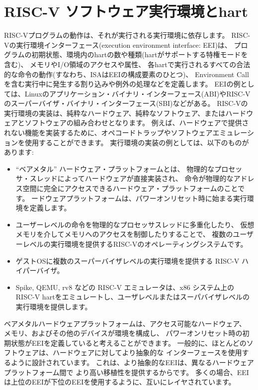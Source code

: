 \section{RISC-V ソフトウェア実行環境とhart}

RISC-Vプログラムの動作は、それが実行される実行環境に依存します。
RISC-Vの実行環境インターフェース(execution environment interface: EEI)は、
プログラムの初期状態、環境内のhartの数や種類(hartがサポートする特権モードを含む)、
メモリやI/O領域のアクセスや属性、
各hartで実行されるすべての合法的な命令の動作(すなわち、ISAはEEIの構成要素のひとつ)、
Environment Callを含む実行中に発生する割り込みや例外の処理などを定義します。
EEIの例としては、Linuxのアプリケーション・バイナリ・インターフェース(ABI)やRISC-Vのスーパーバイザ・バイナリ・インターフェース(SBI)などがある。
RISC-Vの実行環境の実装は、純粋なハードウェア、純粋なソフトウェア、またはハードウェアとソフトウェアの組み合わせとなります。
例えば、ハードウェアで提供されない機能を実装するために、オペコードトラップやソフトウェアエミュレーションを使用することができます。
実行環境の実装の例としては、以下のものがあります:
\begin{itemize}
\item ``ベアメタル'' ハードウェア・プラットフォームとは、
物理的なプロセッサ・スレッドによってハードウェアが直接実装され、
命令が物理的なアドレス空間に完全にアクセスできるハードウェア・プラットフォームのことです。
ードウェアプラットフォームは、パワーオンリセット時に始まる実行環境を定義します。
\item ユーザーレベルの命令を物理的なプロセッサスレッドに多重化したり、
仮想メモリを介してメモリへのアクセスを制御したりすることで、
複数のユーザーレベルの実行環境を提供するRISC-Vのオペレーティングシステムです。
\item ゲストOSに複数のスーパーバイザレベルの実行環境を提供する RISC-V ハイパーバイザ。
\item Spike, QEMU, rv8 などの RISC-V エミュレータは、x86 システム上の RISC-V hartをエミュレートし、ユーザレベルまたはスーパバイザレベルの実行環境を提供します。
\end{itemize}

\begin{commentary}
ベアメタルハードウェアプラットフォームは、アクセス可能なハードウェア、
メモリ、およびその他のデバイスが環境を構成し、
パワーオンリセット時の初期状態がEEIを定義していると考えることができます。
一般的に、ほとんどのソフトウェアは、ハードウェアに対してより抽象的な
インターフェースを使用するように設計されています。
これは、より抽象的なEEIは、異なるハードウェアプラットフォーム間で
より高い移植性を提供するからです。
多くの場合、EEIは上位のEEIが下位のEEIを使用するように、互いにレイヤされています。
\end{commentary}

